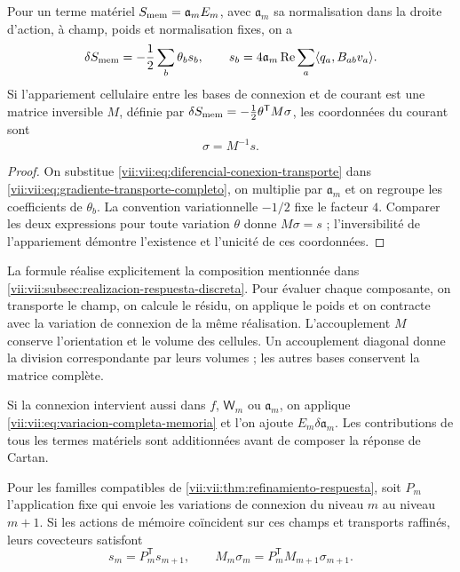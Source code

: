 \begin{theorem}
\label{vii:vii:thm:corriente-conexion-evaluada}
Pour un terme matériel \(S_{\rm mem}=\mathfrak a_m E_m\), avec \(\mathfrak a_m\) sa normalisation dans la droite d'action, à champ, poids et normalisation fixes, on a
\begin{equation}
 \delta S_{\rm mem}=-\frac12\sum_b\theta_b s_b,\qquad
 s_b=4\mathfrak a_m\operatorname{Re}
        \sum_a\langle q_a,B_{ab}v_a\rangle.
 \label{vii:vii:eq:componentes-corriente-conexion}
\end{equation}
Si l'appariement cellulaire entre les bases de connexion et de courant
est une matrice inversible \(M\), définie par
\(\delta S_{\rm mem}=-\tfrac12\theta^{\mathsf T}M\sigma\),
les coordonnées du courant sont
\begin{equation}
 \sigma=M^{-1}s.
 \label{vii:vii:eq:coordenadas-corriente-material}
\end{equation}
\end{theorem}

\begin{proof}
On substitue \eqref{vii:vii:eq:diferencial-conexion-transporte} dans
\eqref{vii:vii:eq:gradiente-transporte-completo}, on multiplie par
\(\mathfrak a_m\) et on regroupe les coefficients de
\(\theta_b\). La convention variationnelle \(-1/2\) fixe le
facteur \(4\). Comparer les deux expressions pour toute variation
\(\theta\) donne \(M\sigma=s\) ; l'inversibilité de
l'appariement démontre l'existence et l'unicité de ces coordonnées.
\end{proof}

La formule réalise explicitement la composition mentionnée dans \ref{vii:vii:subsec:realizacion-respuesta-discreta}. Pour évaluer chaque composante, on transporte le champ, on calcule le résidu, on applique le poids et on contracte avec la variation de connexion de la même réalisation. L'accouplement \(M\) conserve l'orientation et le volume des cellules. Un accouplement diagonal donne la division correspondante par leurs volumes ; les autres bases conservent la matrice complète.

Si la connexion intervient aussi dans \(f\), \(\mathsf W_m\)
ou \(\mathfrak a_m\), on applique
\eqref{vii:vii:eq:variacion-completa-memoria} et l'on ajoute
\(E_m\delta\mathfrak a_m\). Les contributions de tous les
termes matériels sont additionnées avant de composer la réponse de Cartan.

\begin{corollary}
\label{vii:vii:cor:refinamiento-corriente-conexion}
Pour les familles compatibles de
\ref{vii:vii:thm:refinamiento-respuesta}, soit \(P_m\) l'application fixe
qui envoie les variations de connexion du niveau \(m\) au niveau
\(m+1\). Si les actions de mémoire coïncident sur ces champs
et transports raffinés, leurs covecteurs satisfont
\[
 s_m=P_m^{\mathsf T}s_{m+1},\qquad
 M_m\sigma_m=P_m^{\mathsf T}M_{m+1}\sigma_{m+1}.
\]
\end{corollary}

